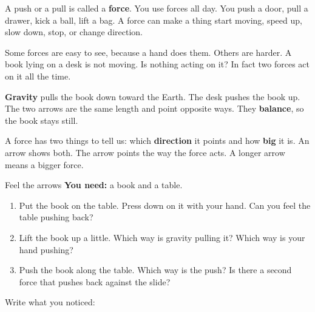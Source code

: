 \label{ch1}

A push or a pull is called a \textbf{force}. You use forces all day. You push a door, pull a drawer, kick a ball, lift a bag. A force can make a thing start moving, speed up, slow down, stop, or change direction.

Some forces are easy to see, because a hand does them. Others are harder. A book lying on a desk is not moving. Is nothing acting on it? In fact two forces act on it all the time.

\begin{center}
\end{center}

\textbf{Gravity} pulls the book down toward the Earth. The desk pushes the book up. The two arrows are the same length and point opposite ways. They \textbf{balance}, so the book stays still.

A force has two things to tell us: which \textbf{direction} it points and how \textbf{big} it is. An arrow shows both. The arrow points the way the force acts. A longer arrow means a bigger force.

\begin{center}
\end{center}

\begin{tryit}{Feel the arrows}
\textbf{You need:} a book and a table.
\begin{enumerate}[leftmargin=1.6em]
\item Put the book on the table. Press down on it with your hand. Can you feel the table pushing back?
\item Lift the book up a little. Which way is gravity pulling it? Which way is your hand pushing?
\item Push the book along the table. Which way is the push? Is there a second force that pushes back against the slide?
\end{enumerate}
Write what you noticed: \wline[7cm]
\end{tryit}

